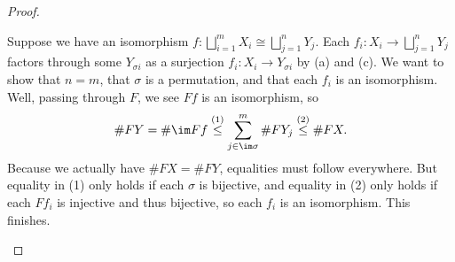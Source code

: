 \documentclass{amsart}
\begin{document}
\begin{proof}
\begin{listalph}
        \item Suppose we have an isomorphism $f\colon\bigsqcup_{i=1}^mX_i\cong\bigsqcup_{j=1}^nY_j$. Each $f_i\colon X_i\to\bigsqcup_{j=1}^nY_j$ factors through some $Y_{\sigma i}$ as a surjection $f_i\colon X_i\to Y_{\sigma i}$ by (a) and (c). We want to show that $n=m$, that $\sigma$ is a permutation, and that each $f_i$ is an isomorphism. Well, passing through $F$, we see $Ff$ is an isomorphism, so
        \[\#FY=\#\im Ff\stackrel{(1)}\le\sum_{j\in\im\sigma}^m\#FY_j\stackrel{(2)}\le\#FX.\]
        Because we actually have $\#FX=\#FY$, equalities must follow everywhere. But equality in (1) only holds if each $\sigma$ is bijective, and equality in (2) only holds if each $Ff_i$ is injective and thus bijective, so each $f_i$ is an isomorphism. This finishes.
        \qedhere
    \end{listalph}
\end{proof}
\end{document}
